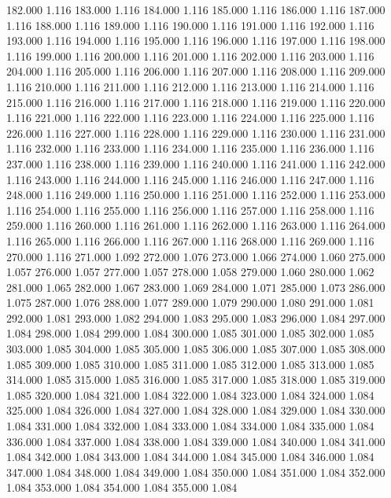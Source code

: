 182.000 1.116 
183.000 1.116 
184.000 1.116 
185.000 1.116 
186.000 1.116 
187.000 1.116 
188.000 1.116 
189.000 1.116 
190.000 1.116 
191.000 1.116 
192.000 1.116 
193.000 1.116 
194.000 1.116 
195.000 1.116 
196.000 1.116 
197.000 1.116 
198.000 1.116 
199.000 1.116 
200.000 1.116 
201.000 1.116 
202.000 1.116 
203.000 1.116 
204.000 1.116 
205.000 1.116 
206.000 1.116 
207.000 1.116 
208.000 1.116 
209.000 1.116 
210.000 1.116 
211.000 1.116 
212.000 1.116 
213.000 1.116 
214.000 1.116 
215.000 1.116 
216.000 1.116 
217.000 1.116 
218.000 1.116 
219.000 1.116 
220.000 1.116 
221.000 1.116 
222.000 1.116 
223.000 1.116 
224.000 1.116 
225.000 1.116 
226.000 1.116 
227.000 1.116 
228.000 1.116 
229.000 1.116 
230.000 1.116 
231.000 1.116 
232.000 1.116 
233.000 1.116 
234.000 1.116 
235.000 1.116 
236.000 1.116 
237.000 1.116 
238.000 1.116 
239.000 1.116 
240.000 1.116 
241.000 1.116 
242.000 1.116 
243.000 1.116 
244.000 1.116 
245.000 1.116 
246.000 1.116 
247.000 1.116 
248.000 1.116 
249.000 1.116 
250.000 1.116 
251.000 1.116 
252.000 1.116 
253.000 1.116 
254.000 1.116 
255.000 1.116 
256.000 1.116 
257.000 1.116 
258.000 1.116 
259.000 1.116 
260.000 1.116 
261.000 1.116 
262.000 1.116 
263.000 1.116 
264.000 1.116 
265.000 1.116 
266.000 1.116 
267.000 1.116 
268.000 1.116 
269.000 1.116 
270.000 1.116 
271.000 1.092 
272.000 1.076 
273.000 1.066 
274.000 1.060 
275.000 1.057 
276.000 1.057 
277.000 1.057 
278.000 1.058 
279.000 1.060 
280.000 1.062 
281.000 1.065 
282.000 1.067 
283.000 1.069 
284.000 1.071 
285.000 1.073 
286.000 1.075 
287.000 1.076 
288.000 1.077 
289.000 1.079 
290.000 1.080 
291.000 1.081 
292.000 1.081 
293.000 1.082 
294.000 1.083 
295.000 1.083 
296.000 1.084 
297.000 1.084 
298.000 1.084 
299.000 1.084 
300.000 1.085 
301.000 1.085 
302.000 1.085 
303.000 1.085 
304.000 1.085 
305.000 1.085 
306.000 1.085 
307.000 1.085 
308.000 1.085 
309.000 1.085 
310.000 1.085 
311.000 1.085 
312.000 1.085 
313.000 1.085 
314.000 1.085 
315.000 1.085 
316.000 1.085 
317.000 1.085 
318.000 1.085 
319.000 1.085 
320.000 1.084 
321.000 1.084 
322.000 1.084 
323.000 1.084 
324.000 1.084 
325.000 1.084 
326.000 1.084 
327.000 1.084 
328.000 1.084 
329.000 1.084 
330.000 1.084 
331.000 1.084 
332.000 1.084 
333.000 1.084 
334.000 1.084 
335.000 1.084 
336.000 1.084 
337.000 1.084 
338.000 1.084 
339.000 1.084 
340.000 1.084 
341.000 1.084 
342.000 1.084 
343.000 1.084 
344.000 1.084 
345.000 1.084 
346.000 1.084 
347.000 1.084 
348.000 1.084 
349.000 1.084 
350.000 1.084 
351.000 1.084 
352.000 1.084 
353.000 1.084 
354.000 1.084 
355.000 1.084 
